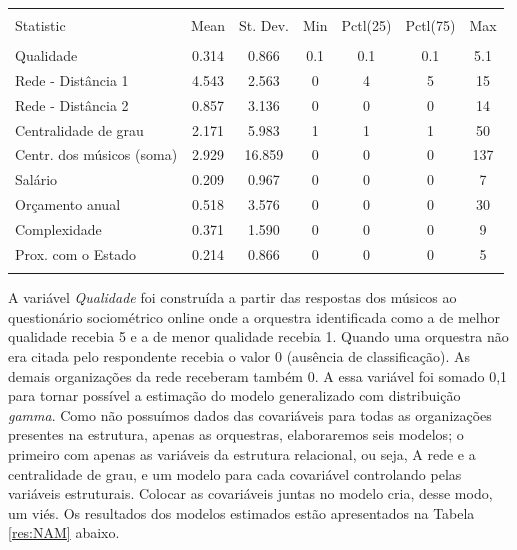 \documentclass[a4paper, 12pt, openright, oneside, german, french, english, brazil]{abntex2}
\begin{document}
	\begin{table}[!htbp] 
		{\begin{tabular}{@{\extracolsep{5pt}}lcccccc} 
			\\[-1.8ex]\hline 
			\hline \\[-1.8ex] 
			Statistic &  \multicolumn{1}{c}{Mean} & \multicolumn{1}{c}{St. Dev.} & \multicolumn{1}{c}{Min} & \multicolumn{1}{c}{Pctl(25)} & \multicolumn{1}{c}{Pctl(75)} & \multicolumn{1}{c}{Max} \\ 
			\hline \\[-1.8ex] 
			Qualidade &  0.314 & 0.866 & 0.1 & 0.1 & 0.1 & 5.1 \\ 
			Rede - Distância 1  & 4.543 & 2.563 & 0 & 4 & 5 & 15 \\ 
			Rede - Distância 2  & 0.857 & 3.136 & 0 & 0 & 0 & 14 \\ 
			Centralidade de grau & 2.171 & 5.983 & 1 & 1 & 1 & 50 \\ 
			Centr. dos músicos (soma) & 2.929 & 16.859 & 0 & 0 & 0 & 137 \\ 
			Salário & 0.209 & 0.967 & 0 & 0 & 0 & 7 \\ 
			Orçamento anual & 0.518 & 3.576 & 0 & 0 & 0 & 30 \\ 
			Complexidade & 0.371 & 1.590 & 0 & 0 & 0 & 9 \\
			Prox. com o Estado & 0.214 & 0.866 & 0 & 0 & 0 & 5 \\ 
			\hline \\[-1.8ex] 
		\end{tabular}
	}
	{}
	\end{table} 

	A variável \textit{Qualidade} foi construída a partir das respostas dos músicos ao questionário sociométrico online onde a orquestra identificada como a de melhor qualidade recebia 5 e a de menor qualidade recebia 1. Quando uma orquestra não era citada pelo respondente recebia o valor 0 (ausência de classificação). As demais organizações da rede receberam também 0. A essa variável foi somado 0,1 para tornar possível a estimação do modelo generalizado com distribuição \textit{gamma}. Como não possuímos dados das covariáveis para todas as organizações presentes na estrutura, apenas as orquestras, elaboraremos seis modelos; o primeiro com apenas as variáveis da estrutura relacional, ou seja, A rede e a centralidade de grau, e um modelo para cada covariável controlando pelas variáveis estruturais. Colocar as covariáveis juntas no modelo cria, desse modo, um viés.
	Os resultados dos modelos estimados estão apresentados na Tabela \ref{res:NAM} abaixo.
	
\end{document}
